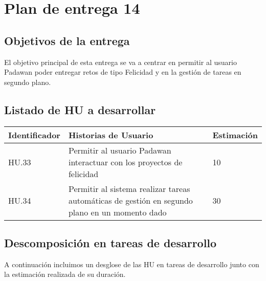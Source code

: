 \section{Plan de entrega 14}

\subsection{Objetivos de la entrega}

El objetivo principal de esta entrega se va a centrar en permitir al usuario Padawan poder entregar retos de tipo Felicidad y en la gestión de tareas en segundo plano.

\subsection{Listado de HU a desarrollar}

\begin{table}[h]
	\centering
	\begin{tabular}{| p{2.3cm} | p{6.7cm} | p{2cm} |}
		\rowcolor[HTML]{329A9D} 
		{\color[HTML]{FFFFFF} \textbf{Identificador}} & {\color[HTML]{FFFFFF} \textbf{Historias de Usuario}} & {\color[HTML]{FFFFFF} \textbf{Estimación}}  \\ \hline
		HU.33 & Permitir al usuario Padawan interactuar con los proyectos de felicidad & 10 \\ \hline
		HU.34 & Permitir al sistema realizar tareas automáticas de gestión en segundo plano en un momento dado & 30 \\ \hline
	\end{tabular}
\end{table}

\subsection{Descomposición en tareas de desarrollo}

A continuación incluimos un desglose de las HU en tareas de desarrollo junto con la estimación realizada de su duración.\\

